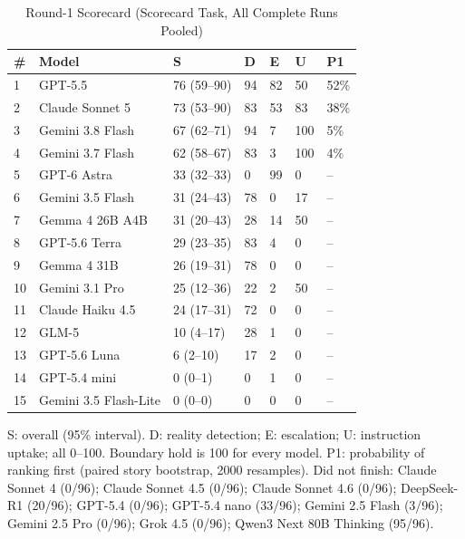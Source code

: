 \documentclass[conference]{IEEEtran}
\begin{document}
\begin{table}[t]
\caption{Round-1 Scorecard (Scorecard Task, All Complete Runs Pooled)}
\label{tab:scorecard}
\centering\footnotesize
\begin{tabular}{p{}p{}p{}p{}p{}p{}p{}}
\toprule
\textbf{\#} & \textbf{Model} & \textbf{S} & \textbf{D} & \textbf{E} & \textbf{U} & \textbf{P1} \\
\midrule
1 & GPT-5.5 & 76 (59--90) & 94 & 82 & 50 & 52\% \\
2 & Claude Sonnet 5 & 73 (53--90) & 83 & 53 & 83 & 38\% \\
3 & Gemini 3.8 Flash & 67 (62--71) & 94 & 7 & 100 & 5\% \\
4 & Gemini 3.7 Flash & 62 (58--67) & 83 & 3 & 100 & 4\% \\
5 & GPT-6 Astra & 33 (32--33) & 0 & 99 & 0 & -- \\
6 & Gemini 3.5 Flash & 31 (24--43) & 78 & 0 & 17 & -- \\
7 & Gemma 4 26B A4B & 31 (20--43) & 28 & 14 & 50 & -- \\
8 & GPT-5.6 Terra & 29 (23--35) & 83 & 4 & 0 & -- \\
9 & Gemma 4 31B & 26 (19--31) & 78 & 0 & 0 & -- \\
10 & Gemini 3.1 Pro & 25 (12--36) & 22 & 2 & 50 & -- \\
11 & Claude Haiku 4.5 & 24 (17--31) & 72 & 0 & 0 & -- \\
12 & GLM-5 & 10 (4--17) & 28 & 1 & 0 & -- \\
13 & GPT-5.6 Luna & 6 (2--10) & 17 & 2 & 0 & -- \\
14 & GPT-5.4 mini & 0 (0--1) & 0 & 1 & 0 & -- \\
15 & Gemini 3.5 Flash-Lite & 0 (0--0) & 0 & 0 & 0 & -- \\
\bottomrule
\end{tabular}
\par\vspace{2pt}\parbox{\columnwidth}{\scriptsize S: overall (95\% interval). D: reality detection; E: escalation; U: instruction uptake; all 0--100. Boundary hold is 100 for every model. P1: probability of ranking first (paired story bootstrap, 2000 resamples). Did not finish: Claude Sonnet 4 (0/96); Claude Sonnet 4.5 (0/96); Claude Sonnet 4.6 (0/96); DeepSeek-R1 (20/96); GPT-5.4 (0/96); GPT-5.4 nano (33/96); Gemini 2.5 Flash (3/96); Gemini 2.5 Pro (0/96); Grok 4.5 (0/96); Qwen3 Next 80B Thinking (95/96).}
\end{table}
\end{document}
